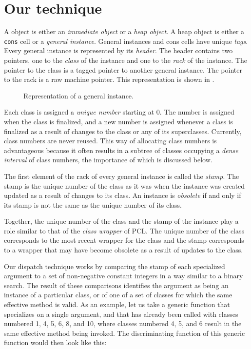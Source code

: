 \section{Our technique}

A \sicl{} object is either an \emph{immediate object} or a \emph{heap
  object}.  A heap object is either a \texttt{cons} cell or a
\emph{general instance}.  General instances and cons cells have unique
\emph{tags}.  Every general instance is represented by its
\emph{header}.  The header contains two pointers, one to the
\emph{class} of the instance and one to the \emph{rack} of the
instance.  The pointer to the class is a tagged pointer to another
general instance.  The pointer to the rack is a raw machine pointer.
This representation is shown in .

\begin{figure}
\begin{center}
\end{center}
\caption{\label{fig-general-instance}
Representation of a general instance.}
\end{figure}

Each class is assigned a \emph{unique number} starting at $0$.  The
number is assigned when the class is finalized, and a new number is
assigned whenever a class is finalized as a result of changes to the
class or any of its superclasses.  Currently, class numbers are never
reused.  This way of allocating class numbers is advantageous because
it often results in a subtree of classes occupying a \emph{dense
  interval} of class numbers, the importance of which is discussed
below. 

The first element of the rack of every general instance is called the
\emph{stamp}.  The stamp is the unique number of the class as it was
when the instance was created updated as a result of changes to its
class.  An instance is \emph{obsolete} if and only if its stamp is not
the same as the unique number of its class.

Together, the unique number of the class and the stamp of the instance
play a role similar to that of the \emph{class wrapper} of PCL.  The
unique number of the class corresponds to the most recent wrapper for
the class and the stamp corresponds to a wrapper that may have become
obsolete as a result of updates to the class.  

Our dispatch technique works by comparing the stamp of each
specialized argument to a set of non-negative constant integers in a
way similar to a binary search.  The result of these comparisons
identifies the argument as being an instance of a particular class, or
of one of a set of classes for which the same effective method is
valid.  As an example, let us take a generic function that specializes
on a single argument, and that has already been called with classes
numbered 1, 4, 5, 6, 8, and 10, where classes numbered 4, 5, and 6
result in the same effective method being invoked.  The discriminating
function of this generic function would then look like this:

